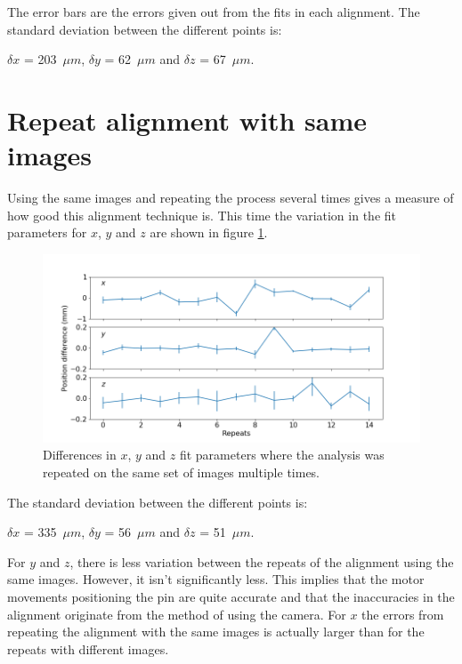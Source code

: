 \documentclass[a4paper,12pt]{article}
\begin{document}
The error bars are the errors given out from the fits in each alignment. The standard deviation between the different points is:

$\delta x$ = 203~$\mu m$, $\delta y$ = 62~$\mu m$ and $\delta z$ = 67~$\mu m$.

	






\section{Repeat alignment with same images}

Using the same images and repeating the process several times gives a measure of how good this alignment technique is. This time the variation in the fit parameters for $x$, $y$ and $z$ are shown in figure \ref{same_image_variation}.

\begin{figure}[tbh]
	\centering
	\includegraphics[width=17cm]{graphics/same_image_variation.png}
	\caption{Differences in $x$, $y$ and $z$ fit parameters where the analysis was repeated on the same set of images multiple times.}
	\label{same_image_variation}
\end{figure}


The standard deviation between the different points is:

$\delta x$ = 335~$\mu m$, $\delta y$ = 56~$\mu m$ and $\delta z$ = 51~$\mu m$.


For $y$ and $z$, there is less variation between the repeats of the alignment using the same images. However, it isn't significantly less. This implies that the motor movements positioning the pin are quite accurate and that the inaccuracies in the alignment originate from the method of using the camera. For $x$ the errors from repeating the alignment with the same images is actually larger than for the repeats with different images.
\end{document}
